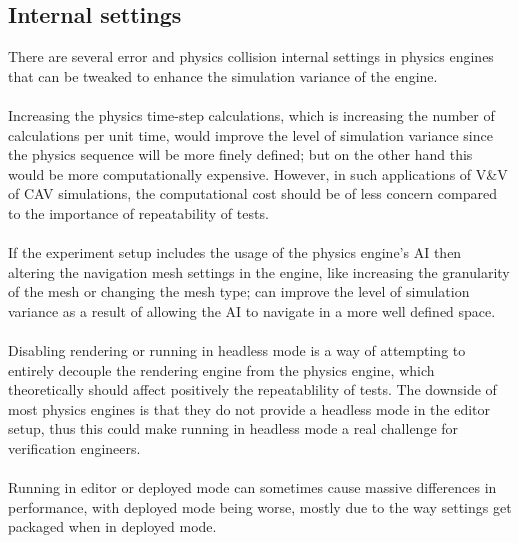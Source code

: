 \subsection{Internal settings}
\noindent There are several error and physics collision internal settings in physics engines that can be tweaked to enhance the simulation variance of the engine. \\\\
\noindent Increasing the physics time-step calculations, which is increasing the number of calculations per unit time, would improve the level of simulation variance since the physics sequence will be more finely defined; but on the other hand this would be more computationally expensive. However, in such applications of V\&V of CAV simulations, the computational cost should be of less concern compared to the importance of repeatability of tests. \\\\
\noindent If the experiment setup includes the usage of the physics engine's AI then altering the navigation mesh settings in the engine, like increasing the granularity of the mesh or changing the mesh type; can improve the level of simulation variance as a result of allowing the AI to navigate in a more well defined space.  \\\\
\noindent Disabling rendering or running in headless mode is a way of attempting to entirely decouple the rendering engine from the physics engine, which theoretically should affect positively the repeatablility of tests. 
The downside of most physics engines is that they do not provide a headless mode in the editor setup, thus this could make running in headless mode a real challenge for verification engineers.  \\\\
\noindent Running in editor or deployed mode can sometimes cause massive differences in performance, with deployed mode being worse, mostly due to the way settings get packaged when in deployed mode.

